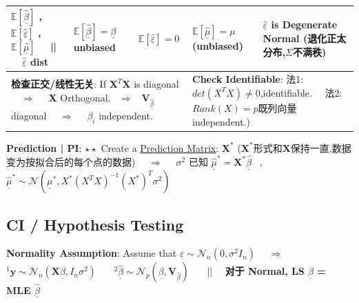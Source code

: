 \documentclass[9pt]{article}
\begin{document}
{\begin{longtable}[alignment]{|l||l|l|l|l|}
    \hline
    $\mathbb{E}[\widehat{\underline{\beta}}]$ , $\mathbb{E}[\underline{\widehat{\varepsilon}}]$ , $\mathbb{E}[\widehat{\underline{\mu}}]$ \ \ || \ \ $\underline{\widehat{\varepsilon}}$ dist & $\mathbb{E}[\widehat{\underline{\beta}}]=\underline{\beta}$ {\tiny unbiased} & $\mathbb{E}[\underline{\widehat{\varepsilon}}]=0$ & $\mathbb{E}[\widehat{\underline{\mu}}]=\mu$ {\tiny (unbiased)} & $\widehat{\underline{\varepsilon}}$ {\tiny is Degenerate Normal (退化正太分布,$\Sigma$不满秩)} \\
    \hline
    \multicolumn{3}{|l|}{\scriptsize \textbf{检查正交/线性无关}: If $\mathbf{X}^T\mathbf{X}$ is diagonal \ \ $\Rightarrow$ \ \ $\mathbf{X}$ Orthogonal. \ $\Rightarrow$ \ $\mathbf{V}_{\underline{\widehat{\beta}}}$ diagonal \ \ $\Rightarrow$ \ \ $\beta_i$ independent.} & \multicolumn{2}{l|}{\tiny\textbf{Check Identifiable}: 法1:$det(X^TX)\ne0$,identifiable. \ \ 法2:$Rank(X)=p$既列向量independent.)} \\
    \hline
\end{longtable}
\vspace{-15pt}
}

\textbf{Prediction | PI}: {\scriptsize $\star\star$ Create a \underline{Prediction Matrix}: $\mathbf{X}^*$} {\scriptsize ($\mathbf{X}^*$形式和$\mathbf{X}$保持一直,数据变为按拟合后的每个点的数据)} \ \ $\Rightarrow$ \ \ {\tiny $\sigma^2$ 已知} {\footnotesize $\underline{\widehat{\mu}}^*=\mathbf{X}^*\underline{\widehat{\beta}}$ \ , \ $\underline{\widehat{\mu}}^*\sim\mathcal{N}(\underline{\mu}^*,X^*(X^TX)^{-1}(X^*)^T\sigma^2)$}


\subsection{CI / Hypothesis Testing}

\textbf{Normality Assumption}: Assume that $\underline{\varepsilon}\sim\mathcal{N}_n(0,\sigma^2I_n)$ \ \ $\Rightarrow$ \ \ $^1\mathbf{y}\sim\mathcal{N}_n(\mathbf{X}\underline{\beta},I_n\sigma^2)$ \ \ \ $^2\underline{\widehat{\beta}}\sim\mathcal{N}_p(\underline{\beta},\mathbf{V}_{\underline{\widehat{\beta}}})$ \ \ \ || \ \ \textbf{\small 对于 Normal, LS $\underline{\widehat{\beta}}$ = MLE $\underline{\widehat{\beta}}$}
\end{document}
